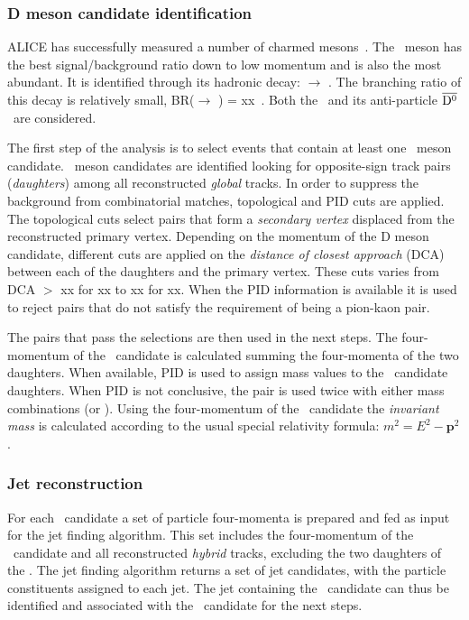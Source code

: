 \documentclass[12pt, a4paper, twoside, titlepage]{article}
\begin{document}
\subsubsection{D meson candidate identification}
ALICE has successfully measured a number of charmed mesons~\cite{}.
The \Dzero\ meson has the best signal/background ratio down to low momentum and
is also the most abundant.
It is identified through its hadronic decay: \Dzero $\rightarrow$ \pip \kam. The branching ratio of this decay
is relatively small, BR(\Dzero $\rightarrow$ \pip \kam) = xx~\cite{}. Both the \Dzero\ and its
anti-particle $\overline{\mathrm{D^{0}}}$~are considered.

The first step of the analysis is to select events that contain at least one \Dzero\ meson candidate.
\Dzero\ meson candidates are identified looking for opposite-sign track pairs (\emph{daughters}) among all reconstructed \emph{global} tracks.
In order to suppress the background from combinatorial matches, topological and PID cuts are applied.
The topological cuts select pairs that form a \emph{secondary vertex} displaced from the reconstructed
primary vertex. Depending on the momentum of the D meson candidate, different cuts are applied on the
\emph{distance of closest approach} (DCA) between each of the daughters and the primary vertex. These cuts
varies from DCA $>$ xx for xx to xx for xx.
When the PID information is available it is used to reject pairs that do not satisfy the requirement of being a pion-kaon pair.

The pairs that pass the selections are then used in the next steps.
The four-momentum of the \Dzero\ candidate is calculated summing the four-momenta of the two daughters.
When available, PID is used to assign mass values to the \Dzero\ candidate daughters. When PID is not conclusive,
the pair is used twice with either mass combinations (\pip \kam or \pim \kap). Using the four-momentum of the \Dzero\ candidate
the \emph{invariant mass} is calculated according to the usual special relativity formula: $m^2 = E^2 - \bm{p}^2$.

\subsubsection{Jet reconstruction}
For each \Dzero\ candidate a set of particle four-momenta is prepared and fed as input for the jet finding algorithm.
This set includes the four-momentum of the \Dzero\ candidate and all reconstructed \emph{hybrid} tracks,
excluding the two daughters of the \Dzero. The jet finding algorithm returns a set of jet candidates, with the particle constituents
assigned to each jet. The jet containing the \Dzero\ candidate can thus be identified and associated with the \Dzero\ candidate for the next steps.
\end{document}
